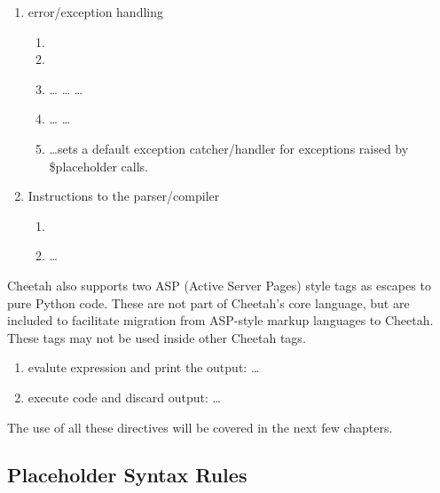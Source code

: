\begin{enumerate}
\item error/exception handling
     \begin{enumerate}
     \item {}
     \item {}
     \item {} \ldots {} \ldots {} \ldots
     \item {} \ldots {} \ldots {}
     \item {} \ldots sets a default exception catcher/handler for
          exceptions raised by \$placeholder calls.
     \end{enumerate}

\item Instructions to the parser/compiler
     \begin{enumerate}
     \item {}
     \item {} \ldots {}
     \end{enumerate}
\end{enumerate}

Cheetah also supports two ASP (Active Server Pages) style tags as escapes to
pure Python code. These are not part of Cheetah's core language, but are
included to facilitate migration from ASP-style markup languages to Cheetah.
These tags may not be used inside other Cheetah tags.
\begin{enumerate}
\item evalute expression and print the output: \code{<\%=} \ldots \code{\%>} 
\item execute code and discard output: \code{<\%} \ldots \code{\%>}
\end{enumerate}

The use of all these directives will be covered in the next few chapters.



\subsection{Placeholder Syntax Rules}
\label{language.placeholdersRules}

